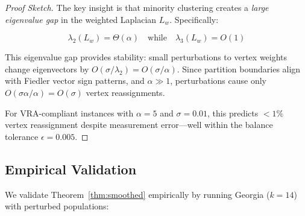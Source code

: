 \begin{proof}[Proof Sketch]
The key insight is that minority clustering creates a \textit{large eigenvalue gap} in the weighted Laplacian $L_w$. Specifically:

\[
\lambda_2(L_w) = \Theta(\alpha) \quad \text{while} \quad \lambda_3(L_w) = O(1)
\]

This eigenvalue gap provides stability: small perturbations to vertex weights change eigenvectors by $O(\sigma / \lambda_2) = O(\sigma / \alpha)$. Since partition boundaries align with Fiedler vector sign patterns, and $\alpha \gg 1$, perturbations cause only $O(\sigma \alpha / \alpha) = O(\sigma)$ vertex reassignments.

For VRA-compliant instances with $\alpha = 5$ and $\sigma = 0.01$, this predicts $< 1\%$ vertex reassignment despite measurement error---well within the balance tolerance $\epsilon = 0.005$.
\end{proof}

\subsection{Empirical Validation}

We validate Theorem~\ref{thm:smoothed} empirically by running Georgia ($k=14$) with perturbed populations:

